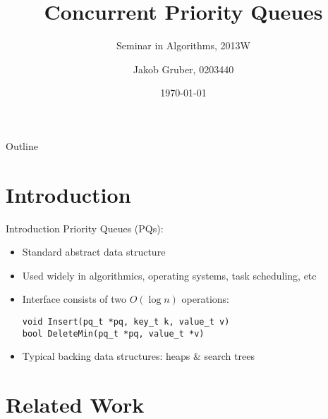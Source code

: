 \documentclass[usenames,dvipsnames]{beamer}
\title{Concurrent Priority Queues}
\subtitle{Seminar in Algorithms, 2013W}
\author{Jakob Gruber, 0203440}
\date{\today}
\begin{document}
\maketitle

\begin{frame}{Outline}
\begin{minipage}[t][10em][t]{\linewidth}
\tableofcontents
\end{minipage}
\end{frame}

\section{Introduction}

\begin{frame}[fragile]{Introduction}
Priority Queues (PQs):

\begin{itemize}
\item Standard abstract data structure
\item Used widely in algorithmics, operating systems, task scheduling, etc
\item Interface consists of two $O(\log n)$ operations:

\begin{lstlisting}
void Insert(pq_t *pq, key_t k, value_t v)
bool DeleteMin(pq_t *pq, value_t *v)
\end{lstlisting}

\item Typical backing data structures: heaps \& search trees
\end{itemize}

\end{frame}

\section{Related Work}
\end{document}
